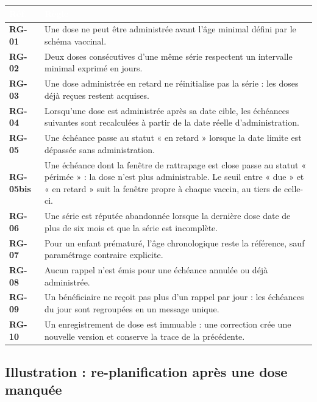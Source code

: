 \documentclass[11pt,a4paper]{article}
\newcommand{\rid}[1]{{\sffamily\bfseries\footnotesize\color{primary}#1}}
\newcommand{\hd}[1]{\textcolor{white}{\sffamily\bfseries\small #1}}
\newcommand{\rowhead}{\rowcolor{primary}}
\begin{document}
\begin{xltabular}{\textwidth}{@{}C{1.5cm} L@{}}
\toprule
\rowhead \hd{Réf.} & \hd{Règle} \\
\midrule \endhead
\rid{RG-01} & Une dose ne peut être administrée avant l'âge minimal défini par le schéma vaccinal. \\
\rid{RG-02} & Deux doses consécutives d'une même série respectent un intervalle minimal exprimé en jours. \\
\rid{RG-03} & Une dose administrée en retard ne réinitialise pas la série : les doses déjà reçues restent acquises. \\
\rid{RG-04} & Lorsqu'une dose est administrée après sa date cible, les échéances suivantes sont recalculées à partir de la date réelle d'administration. \\
\rid{RG-05} & Une échéance passe au statut « en retard » lorsque la date limite est dépassée sans administration. \\
\rid{RG-05bis} & Une échéance dont la fenêtre de rattrapage est close passe au statut « périmée » : la dose n'est plus administrable. Le seuil entre « due » et « en retard » suit la fenêtre propre à chaque vaccin, au tiers de celle-ci. \\
\rid{RG-06} & Une série est réputée abandonnée lorsque la dernière dose date de plus de six mois et que la série est incomplète. \\
\rid{RG-07} & Pour un enfant prématuré, l'âge chronologique reste la référence, sauf paramétrage contraire explicite. \\
\rid{RG-08} & Aucun rappel n'est émis pour une échéance annulée ou déjà administrée. \\
\rid{RG-09} & Un bénéficiaire ne reçoit pas plus d'un rappel par jour : les échéances du jour sont regroupées en un message unique. \\
\rid{RG-10} & Un enregistrement de dose est immuable : une correction crée une nouvelle version et conserve la trace de la précédente. \\
\bottomrule
\end{xltabular}

\subsection{Illustration : re-planification après une dose manquée}
\end{document}

